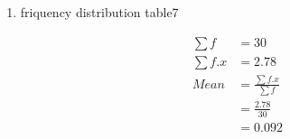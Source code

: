 \renewcommand{\theequation}{\theenumi}
\begin{enumerate}[label=\arabic*.,ref=\thesubsection.\theenumi]
\item \begin{table}[!ht]
	\centering
	
	\caption{friquency distribution table7 }
\end{table}
\begin{align}
\sum{f} &= 30
\\
\sum{f.x} &= 2.78
\\
Mean &= \frac{\sum{f.x}}{\sum{f}}
\\ &= \frac{2.78}{30}
\\&= 0.092
\end{align}
\end{enumerate}